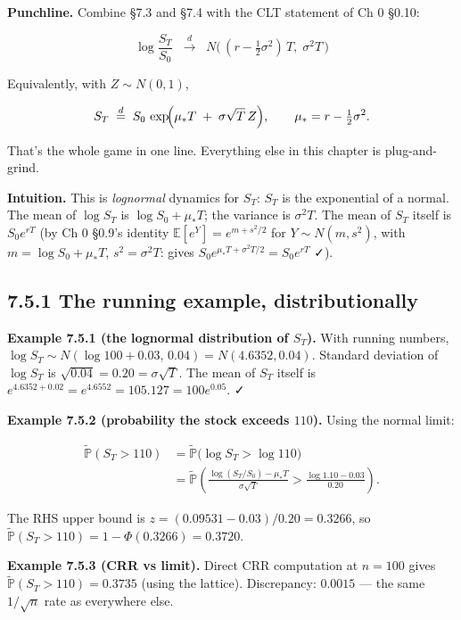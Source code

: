 \documentclass[
  10pt,
  twoside]{book}
\begin{document}
\textbf{Punchline.} Combine §7.3 and §7.4 with the CLT statement of Ch 0
§0.10:

\[\boxed{\;\; \log\!\frac{S_T}{S_0} \;\;\xrightarrow{d}\;\; N\!\bigl(\,(r - \tfrac{1}{2}\sigma^2)\,T,\; \sigma^2 T\,\bigr) \;\;}\]

Equivalently, with \(Z \sim N(0,1)\),

\[S_T \;\stackrel{d}{=}\; S_0 \,\exp\!\Bigl(\mu_* T \;+\; \sigma\sqrt T\, Z\Bigr), \qquad \mu_* = r - \tfrac{1}{2}\sigma^2.\]

That's the whole game in one line. Everything else in this chapter is
plug-and-grind.

\textbf{Intuition.} This is \emph{lognormal} dynamics for \(S_T\):
\(S_T\) is the exponential of a normal. The mean of \(\log S_T\) is
\(\log S_0 + \mu_* T\); the variance is \(\sigma^2 T\). The mean of
\(S_T\) itself is \(S_0 e^{rT}\) (by Ch 0 §0.9's identity
\(\mathbb E[e^Y] = e^{m + s^2/2}\) for \(Y\sim N(m,s^2)\), with
\(m = \log S_0 + \mu_* T\), \(s^2 = \sigma^2 T\): gives
\(S_0 e^{\mu_* T + \sigma^2 T/2} = S_0 e^{rT}\) ✓).

\subsection{7.5.1 The running example,
distributionally}\label{the-running-example-distributionally}

\textbf{Example 7.5.1 (the lognormal distribution of \(S_T\)).} With
running numbers,
\(\log S_T \sim N(\log 100 + 0.03,\, 0.04) = N(4.6352, 0.04)\). Standard
deviation of \(\log S_T\) is \(\sqrt{0.04} = 0.20 = \sigma\sqrt T\). The
mean of \(S_T\) itself is
\(e^{4.6352 + 0.02} = e^{4.6552} = 105.127 = 100 e^{0.05}\). ✓

\textbf{Example 7.5.2 (probability the stock exceeds \(110\)).} Using
the normal limit:

\[\begin{aligned}
\tilde{\mathbb P}(S_T > 110) &= \tilde{\mathbb P}\bigl(\log S_T > \log 110\bigr) \\
&= \tilde{\mathbb P}\!\left(\frac{\log(S_T/S_0) - \mu_* T}{\sigma\sqrt T} > \frac{\log 1.10 - 0.03}{0.20}\right).
\end{aligned}\]

The RHS upper bound is \(z = (0.09531 - 0.03)/0.20 = 0.3266\), so
\(\tilde{\mathbb P}(S_T > 110) = 1 - \Phi(0.3266) = 0.3720\).

\textbf{Example 7.5.3 (CRR vs limit).} Direct CRR computation at
\(n = 100\) gives \(\tilde{\mathbb P}(S_T > 110) = 0.3735\) (using the
lattice). Discrepancy: \(0.0015\) --- the same \(1/\sqrt n\) rate as
everywhere else.
\end{document}
